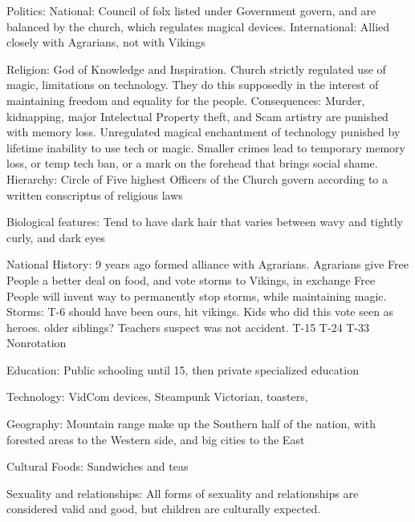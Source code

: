 \documentclass[blue]{GL2020}
\begin{document}
Politics:
	National: Council of folx listed under Government govern, and are balanced by the church, which regulates magical devices.
	International:  Allied closely with Agrarians, not with Vikings
	
Religion:		God of Knowledge and Inspiration.  Church strictly regulated use of magic, limitations on technology.  They do this supposedly in the interest of maintaining freedom and equality for the people.  
	Consequences:  Murder, kidnapping, major Intelectual Property theft, and Scam artistry are punished with memory loss.  Unregulated magical enchantment of technology punished by lifetime inability to use tech or magic.  Smaller crimes lead to temporary memory loss, or temp tech ban, or a mark on the forehead that brings social shame.
	Hierarchy:  Circle of Five highest Officers of the Church govern according to a written conscriptus of religious laws
	
	
Biological features:	Tend to have dark hair that varies between wavy and tightly curly, and dark eyes

National History:		9 years ago formed alliance with Agrarians.  Agrarians give Free People a better deal on food, and vote storms to Vikings, in exchange Free People will invent way to permanently stop storms, while maintaining magic.  %
	Storms:		T-6 should have been ours, hit vikings.  Kids who did this vote seen as heroes.  older siblings?  Teachers suspect was not accident.
						T-15
						T-24
						T-33
						Nonrotation
	
Education:	Public schooling until 15, then private specialized education

Technology:		VidCom devices, Steampunk Victorian, toasters, 

Geography:	Mountain range make up the Southern half of the nation, with forested areas to the Western side, and big cities to the East

Cultural Foods:	Sandwiches and teas

Sexuality and relationships:	All forms of sexuality and relationships are considered valid and good, but children are culturally expected.
\end{document}
